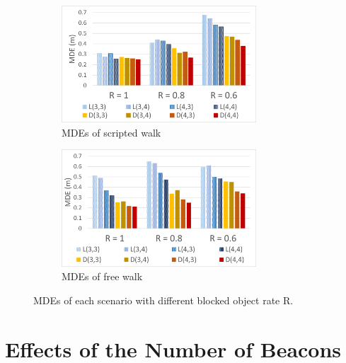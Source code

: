 \documentclass[a4paper,12pt]{report}
\begin{document}
\begin{figure}[tbph]%
    \begin{subfigure}{1\linewidth}
    \centering
        \includegraphics[width=0.8\textwidth]{images/5_6_Blocked_Object_MDE_SW.png}
        \caption{MDEs of scripted walk}
        \label{figure:5_6_Blocked_Object_MDE_SW}
    \end{subfigure}
    \begin{subfigure}{1\linewidth}
    \centering
        \includegraphics[width=0.8\textwidth]{images/5_6_Blocked_Object_MDE_FW.png}
        \caption{MDEs of free walk}
        \label{figure:5_6_Blocked_Object_MDE_FW}
    \end{subfigure}
\caption{MDEs of each scenario with different blocked object rate R.}
\label{figure:5_6_Blocked_Object_MDE}
\end{figure}

\section{Effects of the Number of Beacons}
\end{document}
